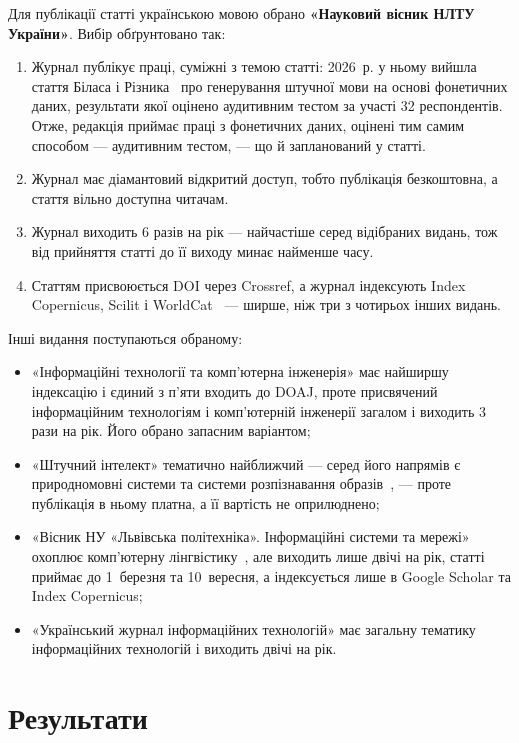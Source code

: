 \documentclass[14pt,a4paper]{extreport}
\begin{document}
Для публікації статті українською мовою обрано \textbf{«Науковий вісник НЛТУ України»}. Вибір обґрунтовано так:

\begin{enumerate}
\item Журнал публікує праці, суміжні з темою статті: 2026~р. у ньому вийшла стаття Біласа і Різника~\cite{bilas2026} про генерування штучної мови на основі фонетичних даних, результати якої оцінено аудитивним тестом за участі 32 респондентів. Отже, редакція приймає праці з фонетичних даних, оцінені тим самим способом — аудитивним тестом, — що й запланований у статті.
\item Журнал має діамантовий відкритий доступ, тобто публікація безкоштовна, а стаття вільно доступна читачам.
\item Журнал виходить 6 разів на рік — найчастіше серед відібраних видань, тож від прийняття статті до її виходу минає найменше часу.
\item Статтям присвоюється DOI через Crossref, а журнал індексують Index Copernicus, Scilit і WorldCat~\cite{nltu} — ширше, ніж три з чотирьох інших видань.
\end{enumerate}

Інші видання поступаються обраному:

\begin{itemize}
\item «Інформаційні технології та комп'ютерна інженерія» має найширшу індексацію і єдиний з п'яти входить до DOAJ, проте присвячений інформаційним технологіям і комп'ютерній інженерії загалом і виходить 3 рази на рік. Його обрано запасним варіантом;
\item «Штучний інтелект» тематично найближчий — серед його напрямів є природномовні системи та системи розпізнавання образів~\cite{jai}, — проте публікація в ньому платна, а її вартість не оприлюднено;
\item «Вісник НУ «Львівська політехніка». Інформаційні системи та мережі» охоплює комп'ютерну лінгвістику~\cite{sisn}, але виходить лише двічі на рік, статті приймає до 1~березня та 10~вересня, а індексується лише в Google Scholar та Index Copernicus;
\item «Український журнал інформаційних технологій» має загальну тематику інформаційних технологій і виходить двічі на рік.
\end{itemize}

\section{Результати}
\end{document}
